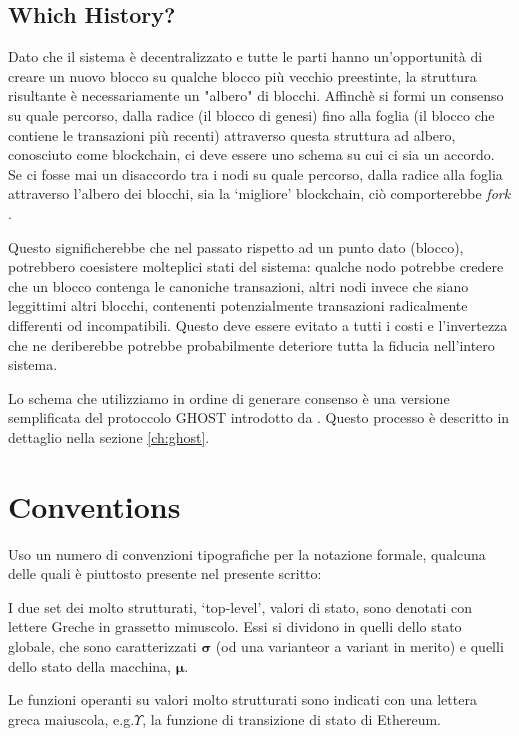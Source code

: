 \documentclass[9pt,oneside]{amsart}
\makeatletter
\newcommand*\eg{e.g.\@\xspace}
\makeatother
\begin{document}
\begin{multicols}{2}
\subsection{Which History?}

Dato che il sistema è decentralizzato e tutte le parti hanno un'opportunità di creare un nuovo blocco su qualche blocco più vecchio preestinte, la struttura risultante è necessariamente un "albero" di blocchi. Affinchè si formi un consenso su quale percorso, dalla radice (il blocco di genesi) fino alla foglia (il blocco che contiene le transazioni più recenti) attraverso questa struttura ad albero, conosciuto come blockchain, ci deve essere uno schema su cui ci sia un accordo. Se ci fosse mai un disaccordo tra i nodi su quale percorso, dalla radice alla foglia attraverso l'albero dei blocchi, sia la `migliore' blockchain, ciò comporterebbe \textit{fork} .

Questo significherebbe che nel passato rispetto ad un punto dato (blocco), potrebbero coesistere molteplici stati del sistema: qualche nodo potrebbe credere che un blocco contenga le canoniche transazioni, altri nodi invece che siano leggittimi altri blocchi, contenenti potenzialmente transazioni radicalmente differenti od incompatibili. Questo deve essere evitato a tutti i costi e l'invertezza che ne deriberebbe potrebbe probabilmente deteriore tutta la fiducia nell'intero sistema.

Lo schema che utilizziamo in ordine di generare consenso è una versione semplificata del protoccolo GHOST introdotto da \cite{cryptoeprint:2013:881}. Questo processo è descritto in dettaglio nella sezione \ref{ch:ghost}.

\section{Conventions}\label{ch:conventions}

Uso un numero di convenzioni tipografiche per la notazione formale, qualcuna delle quali è piuttosto presente nel presente scritto:

I due set dei molto strutturati, `top-level', valori di stato, sono denotati con lettere Greche in  grassetto minuscolo. Essi si dividono in quelli dello stato globale, che sono caratterizzati $\boldsymbol{\sigma}$ (od una varianteor a variant in merito) e quelli dello stato della macchina, $\boldsymbol{\mu}$.

Le funzioni operanti su valori molto strutturati sono indicati con una lettera greca maiuscola, \eg $\Upsilon$, la funzione di transizione di stato di Ethereum.


\end{multicols}
\end{document}
